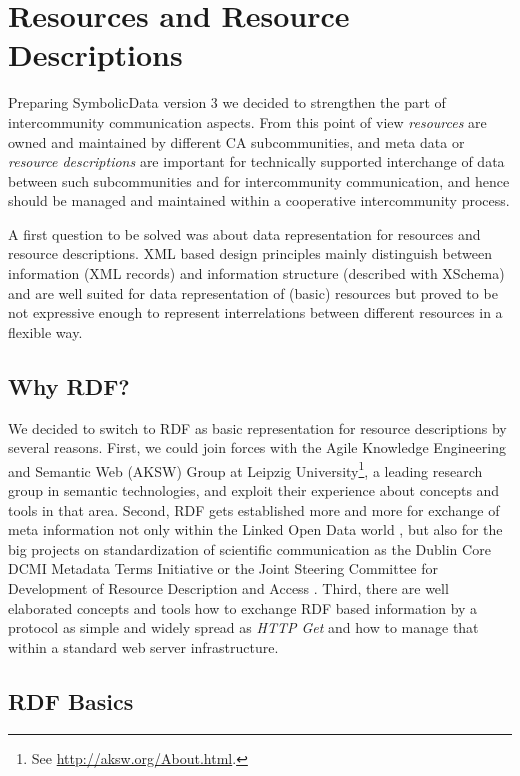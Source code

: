 \documentclass{llncs}
\newcommand{\SD}{{\sc Symbolic\-Data}}
\begin{document}
\section{Resources and Resource Descriptions}

Preparing {\SD} version 3 we decided to strengthen the part of intercommunity
communication aspects.  From this point of view \emph{resources} are owned and
maintained by different CA subcommunities, and meta data or \emph{resource
  descriptions} are important for technically supported interchange of data
between such subcommunities and for intercommunity communication, and hence
should be managed and maintained within a cooperative intercommunity process.

A first question to be solved was about data representation for resources and
resource descriptions.  XML based design principles mainly distinguish between
information (XML records) and information structure (described with XSchema)
and are well suited for data representation of (basic) resources but proved to
be not expressive enough to represent interrelations between different
resources in a flexible way.

\subsection{Why RDF?}

We decided to switch to RDF as basic representation for resource descriptions
by several reasons. First, we could join forces with the Agile Knowledge
Engineering and Semantic Web (AKSW) Group at Leipzig University\footnote{See
  \url{http://aksw.org/About.html}.}, a leading research group in semantic
technologies, and exploit their experience about concepts and tools in that
area. Second, RDF gets established more and more for exchange of meta
information not only within the Linked Open Data world \cite{lod}, but also
for the big projects on standardization of scientific communication as the
Dublin Core DCMI Metadata Terms Initiative \cite{dcterms} or the Joint
Steering Committee for Development of Resource Description and Access
\cite{RDA}.  Third, there are well elaborated concepts and tools how to
exchange RDF based information by a protocol as simple and widely spread as
\emph{HTTP Get} and how to manage that within a standard web server
infrastructure.

\subsection{RDF Basics}
\end{document}
